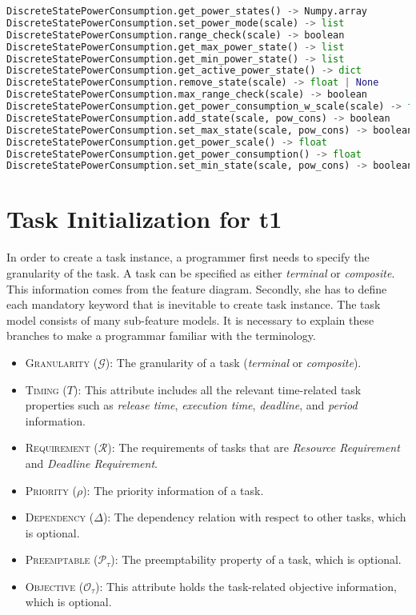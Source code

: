 \documentclass[]{scrartcl}
\begin{document}
\begin{lstlisting}[language=Python, frame=single, label={lst:cpu2memberFunctionsPowerDiscrete}, caption={The member functions for \textsf{DiscreteStatePowerConsumption} module.}]
DiscreteStatePowerConsumption.get_power_states() -> Numpy.array
DiscreteStatePowerConsumption.set_power_mode(scale) -> list
DiscreteStatePowerConsumption.range_check(scale) -> boolean
DiscreteStatePowerConsumption.get_max_power_state() -> list
DiscreteStatePowerConsumption.get_min_power_state() -> list
DiscreteStatePowerConsumption.get_active_power_state() -> dict
DiscreteStatePowerConsumption.remove_state(scale) -> float | None
DiscreteStatePowerConsumption.max_range_check(scale) -> boolean
DiscreteStatePowerConsumption.get_power_consumption_w_scale(scale) -> float
DiscreteStatePowerConsumption.add_state(scale, pow_cons) -> boolean
DiscreteStatePowerConsumption.set_max_state(scale, pow_cons) -> boolean
DiscreteStatePowerConsumption.get_power_scale() -> float
DiscreteStatePowerConsumption.get_power_consumption() -> float
DiscreteStatePowerConsumption.set_min_state(scale, pow_cons) -> boolean
\end{lstlisting}
        
            
\section{Task Initialization for \textsf{t1}}
        
In order to create a task instance, a programmer first needs to specify the granularity of the task. A task can be specified as either \emph{terminal} or \emph{composite}. This information comes from the feature diagram.
Secondly, she has to define each mandatory keyword that is inevitable to create task instance. The task model consists of many sub-feature models. It is necessary to explain these branches to make a programmar familiar with
the terminology.
\begin{itemize}
    \item \textsc{Granularity} ($\mathcal{G}$): The granularity of a task (\emph{terminal} or \emph{composite}).
    \item \textsc{Timing} ($T$): This attribute includes all the relevant time-related task properties such as \emph{release time}, \emph{execution time}, \emph{deadline}, and \emph{period} information.
    \item \textsc{Requirement} ($\mathcal{R}$): The requirements of tasks that are \emph{Resource Requirement} and \emph{Deadline Requirement}.
    \item \textsc{Priority} ($\rho$): The priority information of a task.
    \item \textsc{Dependency} ($\Delta$): The dependency relation with respect to other tasks, which is optional.
    \item \textsc{Preemptable} ($\mathcal{P}_\tau$): The preemptability property of a task, which is optional.
    \item \textsc{Objective} ($\mathcal{O}_{\tau}$): This attribute holds the task-related objective information, which is optional.
\end{itemize}
\end{document}
